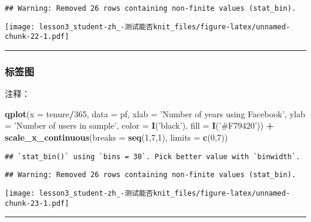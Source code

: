 \documentclass[]{article}
\newenvironment{Shaded}{\begin{snugshade}}{\end{snugshade}}
\newcommand{\DataTypeTok}[1]{\textcolor[rgb]{0.13,0.29,0.53}{#1}}
\newcommand{\DecValTok}[1]{\textcolor[rgb]{0.00,0.00,0.81}{#1}}
\newcommand{\KeywordTok}[1]{\textcolor[rgb]{0.13,0.29,0.53}{\textbf{#1}}}
\newcommand{\NormalTok}[1]{#1}
\newcommand{\OperatorTok}[1]{\textcolor[rgb]{0.81,0.36,0.00}{\textbf{#1}}}
\newcommand{\StringTok}[1]{\textcolor[rgb]{0.31,0.60,0.02}{#1}}
\begin{document}
\begin{verbatim}
## Warning: Removed 26 rows containing non-finite values (stat_bin).
\end{verbatim}

\texttt{[image: lesson3\_student-zh\_-测试能否knit\_files/figure-latex/unnamed-chunk-22-1.pdf]}

\begin{center}\rule{0.5\linewidth}{\linethickness}\end{center}

\subsubsection{标签图}

注释：

\begin{Shaded}
\begin{Highlighting}[]
\KeywordTok{qplot}\NormalTok{(}\DataTypeTok{x =}\NormalTok{ tenure}\OperatorTok{/}\DecValTok{365}\NormalTok{, }\DataTypeTok{data =}\NormalTok{ pf, }
      \DataTypeTok{xlab =} \StringTok{'Number of years using Facebook'}\NormalTok{,}
      \DataTypeTok{ylab =} \StringTok{'Number of users in sample'}\NormalTok{,}
      \DataTypeTok{color =} \KeywordTok{I}\NormalTok{(}\StringTok{'black'}\NormalTok{), }\DataTypeTok{fill =} \KeywordTok{I}\NormalTok{(}\StringTok{'#F79420'}\NormalTok{)) }\OperatorTok{+}
\StringTok{  }\KeywordTok{scale_x_continuous}\NormalTok{(}\DataTypeTok{breaks =} \KeywordTok{seq}\NormalTok{(}\DecValTok{1}\NormalTok{,}\DecValTok{7}\NormalTok{,}\DecValTok{1}\NormalTok{), }\DataTypeTok{limits =} \KeywordTok{c}\NormalTok{(}\DecValTok{0}\NormalTok{,}\DecValTok{7}\NormalTok{))}
\end{Highlighting}
\end{Shaded}

\begin{verbatim}
## `stat_bin()` using `bins = 30`. Pick better value with `binwidth`.
\end{verbatim}

\begin{verbatim}
## Warning: Removed 26 rows containing non-finite values (stat_bin).
\end{verbatim}

\texttt{[image: lesson3\_student-zh\_-测试能否knit\_files/figure-latex/unnamed-chunk-23-1.pdf]}

\begin{center}\rule{0.5\linewidth}{\linethickness}\end{center}
\end{document}

